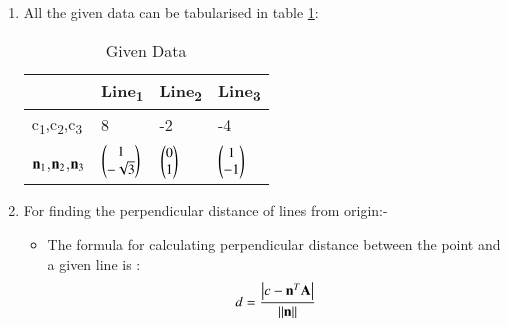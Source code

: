 \documentclass[journal,12pt,twocolumn]{IEEEtran}
\begin{document}
\begin{enumerate}
\item  All the given data can be tabularised in table \ref{tab:table1}:
\begin{table}[!ht]
\begin{center}
\begin{tabular}{ | m{2cm} | m{1.2cm}| m{1.2cm} | m{1.2cm} |} 
\hline
 & Line\textsubscript{1} & Line\textsubscript{2} & Line\textsubscript{3} \\
\hline
c\textsubscript{1},c\textsubscript{2},c\textsubscript{3} & 8 & -2 & -4 \\ 
\hline
$\vec{n\textsubscript{1}}$,$\vec{n\textsubscript{2}}$,$\vec{n\textsubscript{3}}$ & $\myvec{1\\-\sqrt{3}}$ & $\myvec{0\\1}$ &$\myvec{1\\-1}$ \\ 
\hline
\end{tabular}
\end{center}
\caption{Given Data}
\label{tab:table1}
\end{table}
\item For finding the perpendicular distance of lines from origin:-
\begin{itemize}
\item The formula for calculating perpendicular distance between the point and a given line is :
\begin{align}
d=\frac { \left| c-\vec{n}^T\vec{A} \right| }{ \norm{\vec{n}} }
\end{align}


\end{itemize}
\end{enumerate}
\end{document}
